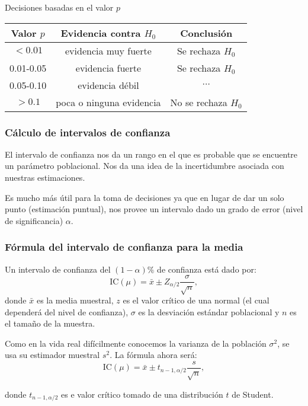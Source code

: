 \documentclass[aspectratio=169]{beamer}
\begin{document}
\begin{frame}{Decisiones basadas en el valor \( p \)}
    \begin{table}
        \centering
        \begin{tabular}{@{}ccc@{}}
            \toprule
            Valor \( p \) & Evidencia contra \( H_0 \) & Conclusión \\
            \midrule
            \( < 0.01 \) & evidencia muy fuerte & Se rechaza \( H_0 \) \\
            0.01-0.05 & evidencia fuerte & Se rechaza \( H_0 \) \\
            0.05-0.10 & evidencia débil & \( \cdots \) \\
            \( > 0.1 \) & poca o ninguna evidencia & No se rechaza \( H_0 \) \\
            \bottomrule
        \end{tabular}
    \end{table}
\end{frame}



\begin{frame}
\frametitle{Cálculo de intervalos de confianza}
El intervalo de confianza nos da un rango en el que es probable que se encuentre un parámetro poblacional. Nos da una idea de la incertidumbre asociada con nuestras estimaciones.

\vfill

Es mucho más útil para la toma de decisiones ya que en lugar de dar un solo punto (estimación puntual), nos provee un intervalo dado un grado de error (nivel de significancia) $\alpha$.

\end{frame}

\begin{frame}
\frametitle{Fórmula del intervalo de confianza para la media}
Un intervalo de confianza del $(1-\alpha)\%$ de confianza está dado por:
\[ \text{IC}(\mu) =  \bar{x} \pm Z_{\alpha/2} \frac{\sigma}{\sqrt{n}}, \]
donde \( \bar{x} \) es la media muestral, \( z \) es el valor crítico de una normal (el cual dependerá del nivel  de confianza), \( \sigma \) es la desviación estándar poblacional y \( n \) es el tamaño de la muestra.

\vfill

Como en la vida real difícilmente conocemos la varianza de la población $\sigma^2$, se usa su estimador muestral $s^2$. La fórmula ahora será:
\[ \text{IC}(\mu) =  \bar{x} \pm t_{n-1,\alpha/2} \frac{s}{\sqrt{n}}, \]

donde $t_{n-1,\alpha/2}$ es e valor crítico tomado de una distribución $t$ de Student.

\end{frame}
\end{document}
